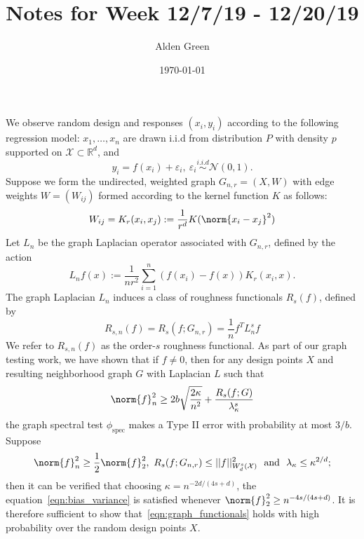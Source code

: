 \documentclass{article}
\newcommand{\Reals}{\mathbb{R}}
\newcommand{\1}{\mathbf{1}}
\newcommand{\Xset}{\mathcal{X}}
\newcommand{\spec}{\mathrm{spec}}
\theoremstyle{alden}
\theoremstyle{aldenthm}
\theoremstyle{definition}
\theoremstyle{remark}
\begin{document}
\title{Notes for Week 12/7/19 - 12/20/19}
\author{Alden Green}
\date{\today}
\maketitle

We observe random design and responses $(x_i,y_i)$ according to the following regression model: $x_1,\ldots,x_n$ are drawn i.i.d from distribution $P$ with density $p$ supported on $\mathcal{X} \subset \Reals^d$, and
\begin{equation*}
y_i = f(x_i) + \varepsilon_i,~ \varepsilon_i \overset{i.i.d}{\sim} \mathcal{N}(0,1).
\end{equation*}
Suppose we form the undirected, weighted graph $G_{n,r} = (X,W)$ with edge weights $W = (W_{ij})$ formed according to the kernel function $K$ as follows:
\begin{equation*}
W_{ij} = K_r(x_i,x_j) := \frac{1}{r^d}K(\norm{x_i - x_j}^2)
\end{equation*}
Let $L_n$ be the graph Laplacian operator associated with $G_{n,r}$, defined by the action
\begin{equation*}
L_nf(x) := \frac{1}{nr^2} \sum_{i = 1}^{n}(f(x_i) - f(x))K_r(x_i,x).
\end{equation*}
The graph Laplacian $L_n$ induces a class of roughness functionals $R_s(f)$, defined by
\begin{equation*}
R_{s,n}(f) = R_s(f;G_{n,r}) = \frac{1}{n} f^T L_n^s f
\end{equation*} 
We refer to $R_{s,n}(f)$ as the order-$s$ roughness functional. As part of our graph testing work, we have shown that if $f \neq 0$, then for any design points $X$ and resulting neighborhood graph $G$ with Laplacian $L$ such that
\begin{equation}
\label{eqn:bias_variance}
\norm{f}_n^2 \geq 2b\sqrt{\frac{2\kappa}{n^2}} + \frac{R_{s}(f;G) }{\lambda_{\kappa}^s}
\end{equation}
the graph spectral test $\phi_{\spec}$ makes a Type II error with probability at most $3/b$. Suppose
\begin{equation}
\label{eqn:graph_functionals}
\norm{f}_n^2 \geq \frac{1}{2}\norm{f}_2^2, ~R_s(f;G_{n,r}) \leq ||f||_{W_{d}^{s}(\Xset)}^2 ~~\textrm{and}~~ \lambda_{\kappa} \leq \kappa^{2/d};
\end{equation}
then it can be verified that choosing $\kappa = n^{-2d/(4s + d)}$, the equation~\eqref{eqn:bias_variance} is satisfied whenever $\norm{f}_2^2 \geq n^{-4s/(4s + d)}$. It is therefore sufficient to show that~\eqref{eqn:graph_functionals} holds with high probability over the random design points $X$.
\end{document}
